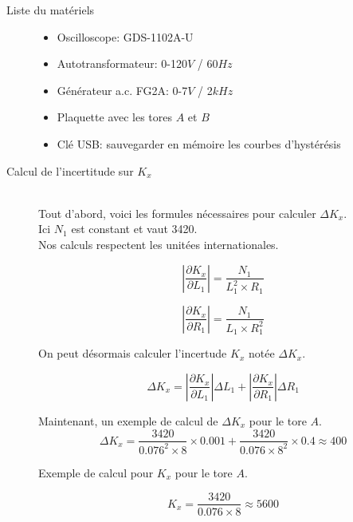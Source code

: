 \documentclass{article}
\begin{document}
\begin{description}

\item[Liste du matériels]\hfill
\begin{itemize}
\item Oscilloscope: GDS-1102A-U
\item Autotransformateur: 0-120$V$ / 60$Hz$
\item Générateur a.c. FG2A: 0-7$V$ / 2$kHz$
\item Plaquette avec les tores $A$ et $B$
\item Clé USB: sauvegarder en mémoire les courbes d'hystérésis\\
\end{itemize}


\item[Calcul de l'incertitude sur $K_x$]\hfill\\

Tout d'abord, voici les formules nécessaires pour calculer $\Delta K_x$.\\
Ici $N_1$ est constant et vaut 3420. \\
Nos calculs respectent les unitées internationales.

\begin{equation*}
\left| \frac{\partial K_x}{\partial L_1} \right| = \frac{N_1}{L_1^{2}\times R_1}
\end{equation*}

\begin{equation*}
\left| \frac{\partial K_x}{\partial R_1 } \right| = \frac{N_1}{L_1\times R_1^{2       }}
\end{equation*}


On peut désormais calculer l'incertude $K_x$ notée $\Delta K_x$. \hfill


\begin{equation*}
\Delta K_x = 
\left| \frac{\partial K_x}{\partial L_1} \right|\Delta L_1 +
\left| \frac{\partial K_x}{\partial R_1} \right|\Delta R_1
\end{equation*}

Maintenant, un exemple de calcul de $\Delta K_x$ pour le tore $A$.
\begin{equation*}
\Delta K_x = \frac{3420}{0.076^{2}\times 8}\times 0.001 +
\frac{3420}{0.076\times 8^{2}}\times 0.4\approx 400
\end{equation*}

Exemple de calcul pour $K_x$ pour le tore $A$.

\begin{equation*}
K_x = \frac{3420}{0.076\times 8}\approx 5600
\end{equation*}


\end{description}
\end{document}
